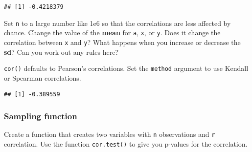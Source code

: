 \documentclass[
  oneside]{book}
\newenvironment{Shaded}{\begin{snugshade}}{\end{snugshade}}
\newcommand{\AttributeTok}[1]{\textcolor[rgb]{0.77,0.63,0.00}{#1}}
\newcommand{\ControlFlowTok}[1]{\textcolor[rgb]{0.13,0.29,0.53}{\textbf{#1}}}
\newcommand{\DecValTok}[1]{\textcolor[rgb]{0.00,0.00,0.81}{#1}}
\newcommand{\FunctionTok}[1]{\textcolor[rgb]{0.00,0.00,0.00}{#1}}
\newcommand{\NormalTok}[1]{#1}
\newcommand{\OtherTok}[1]{\textcolor[rgb]{0.56,0.35,0.01}{#1}}
\newcommand{\SpecialCharTok}[1]{\textcolor[rgb]{0.00,0.00,0.00}{#1}}
\newcommand{\StringTok}[1]{\textcolor[rgb]{0.31,0.60,0.02}{#1}}
\begin{document}
\begin{verbatim}
## [1] -0.4218379
\end{verbatim}

\begin{try}
Set \texttt{n} to a large number like 1e6 so that the correlations are less affected by chance. Change the value of the \textbf{mean} for \texttt{a}, \texttt{x}, or \texttt{y}. Does it change the correlation between \texttt{x} and \texttt{y}? What happens when you increase or decrease the \textbf{sd}? Can you work out any rules here?

\end{try}

\texttt{cor()} defaults to Pearson's correlations. Set the \texttt{method} argument to use Kendall or Spearman correlations.

\begin{Shaded}
\end{Shaded}

\begin{verbatim}
## [1] -0.389559
\end{verbatim}

\hypertarget{sampling-cor}{%
\subsubsection{Sampling function}\label{sampling-cor}}

Create a function that creates two variables with \texttt{n} observations and \texttt{r} correlation. Use the function \texttt{cor.test()} to give you p-values for the correlation.

\begin{Shaded}
\end{Shaded}
\end{document}
